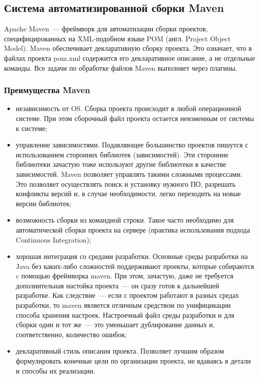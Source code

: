 \subsection{Система автоматизированной сборки Maven}
Apache Maven~--- фреймворк для автоматизации сборки проектов, специфицированных на XML-подобном языке POM (англ. Project Object Model). Maven обеспечивает декларативную сборку проекта. Это означает, что в файлах проекта pom.xml содержится его декларативное описание, а не отдельные команды. Все задачи по обработке файлов Maven выполняет через плагины.

\subsubsection{Преимущества Maven}
\begin{itemize}
\item независимость от OS. Сборка проекта происходит в любой операционной системе. При этом сборочный файл проекта остается неизменным от системы к системе;
\item управление зависимостями. Подавляющее большинство проектов пишутся с использованием сторонних библиотек (зависимостей). Эти сторонние библиотеки зачастую тоже используют другие библиотеки в качестве зависимостей. Maven позволяет управлять такими сложными процессами.  Это позволяет осуществлять поиск и установку нужного ПО, разрешать конфликты версий и, в случае необходимости, легко переходить на новые версии библиотек;
\item возможность сборки из командной строки. Такое часто необходимо для автоматической сборки проекта на сервере (практика использования подхода Continuous Integration);
\item хорошая интеграция со средами разработки. Основные среды разработки на Java без каких-либо сложностей поддерживают проекты, которые собираются c помощью фреймворка maven. При этом, зачастую, даже не требуется дополнительная настойка проекта~--- он сразу готов к дальнейшей разработке. Как следствие~--- если с проектом работают в разных средах разработки, то maven является отличным средством по унифицикации способа хранения настроек. Настроечный файл среды разработки и для сборки один и тот же~--- это уменьшает дублирование данных и, соответственно, количество ошибок;
\item декларативный стиль описания проекта. Позволяет лучшим образом формулировать конечные цели по организации проекта, не вдаваясь в детали и способы их реализации.
\end{itemize}

